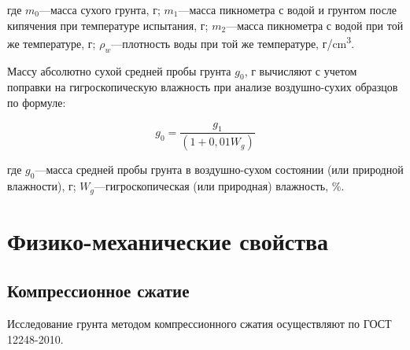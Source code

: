 где $m_0$---масса сухого грунта, г;
$m_1$---масса пикнометра с водой и грунтом после кипячения при
температуре испытания, г;
$m_2$---масса пикнометра с водой при той же температуре, г;
$\rho_w$---плотность воды при той же температуре, г/\si{\centi\meter^3}.

Массу абсолютно сухой средней пробы грунта $g_0$, г вычисляют с
учетом поправки на гигроскопическую влажность при анализе воздушно-сухих
образцов по формуле:

\[
   g_0 = \frac{g_1}{(1+0,01W_g)}
\]

где $g_0$---масса средней пробы грунта в воздушно-сухом состоянии (или
природной влажности), г;
$W_g$---гигроскопическая (или природная) влажность, \%.

\section{Физико-механические свойства}\label{sec:ch6/sec2}

\subsection{Компрессионное сжатие}

Исследование грунта методом компрессионного сжатия осуществляют по ГОСТ 12248-2010.


